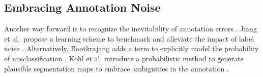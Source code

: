 \subsection{Embracing Annotation Noise}
Another way forward is to recognize the inevitability of annotation errors \citep{Frenay2014}.
Jiang et al.\ propose a learning scheme to benchmark and alleviate the impact of label noise \citep{jiang2020beyond}.
Alternatively, Bootkrajang adds a term to explicitly model the probability of misclassification \citep{BOOTKRAJANG201661}.
Kohl et al. introduce a probabilistic method to generate plausible segmentation maps to embrace ambiguities in the annotation \citep{kohl2018probabilistic}.
